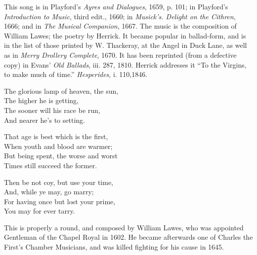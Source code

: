 
This song is in Playford’s \textit{Ayres and Dialogues}, 1659, p. 101; in Playford’s
\textit{Introduction to Music}, third edit., 1660; in \textit{Musick’s. Delight on the Cithren}, 1666;
and in \textit{The Musical Companion}, 1667. The music is the composition of William
Lawes; the poetry by Herrick. It became popular in ballad-form, and is in the
list of those printed by W. Thackeray, at the Angel in Duck Lane, as well as
in \textit{Merry Drollery Complete}, 1670. It has been reprinted (from a defective
copy) in Evans’ \textit{Old Ballads}, iii. 287, 1810. Herrick addresses it “To the
Virgins, to make much of time.” \textit{Hesperides}, i. 110,1846.


\settowidth{\versewidth}{The glorious lamp of heaven, the sun,}
\begin{dcverse}\begin{altverse}
The glorious lamp of heaven, the sun,\\
The higher he is getting,\\
The sooner will his race be run,\\
And nearer he’s to setting.
\end{altverse}

\begin{altverse}
That age is best which is the first,\\
When youth and blood are warmer;\\
But being spent, the worse and worst\\
Times still succeed the former.
\end{altverse}

\begin{altverse}
Then be not coy, but use your time,\\
And, while ye may, go marry;\\
For having once but lost your prime,\\
You may for ever tarry.
\end{altverse}
\end{dcverse}


This is properly a round, and composed by William Lawes, who was appointed
Gentleman of the Chapel Royal in 1602. He became afterwards one of Charles
the First’s Chamber Musicians, and was killed fighting for his cause in 1645.

